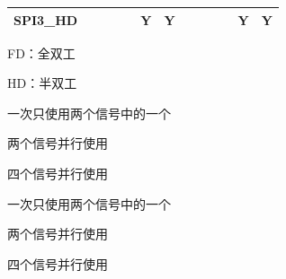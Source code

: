 \documentclass[main\_\_CN.tex]{subfiles}
\begin{document}
\begin{landscape}
\begin{table}[H]
\begin{threeparttable}
\begin{tabular}{ |p{2.0cm} |c|c|c|c|c|c|c|c|c|c|c|c| }
SPI3\_HD                   &         &         &         &         & Y\tnote{5}      & Y      &         &        &         &         & Y\tnote{8}       & Y      \\ \hline
\end{tabular}
        \begin{tablenotes}
                \item[1] FD：全双工
                \item[2] HD：半双工
                \item[3] 一次只使用两个信号中的一个
                \item[4] 两个信号并行使用
                \item[5] 四个信号并行使用
                \item[6] 一次只使用两个信号中的一个
                \item[7] 两个信号并行使用
                \item[8] 四个信号并行使用
        \end{tablenotes}
     \end{threeparttable}
    \end{table}    
\end{landscape}
\end{document}

